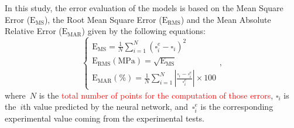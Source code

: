 \documentclass[algorithms,article,submit,pdftex,oneauthors]{Definitions/mdpi}
\DeclareRobustCommand{\MSE}{\text{E}_\text{MS}}
\DeclareRobustCommand{\RMSE}{\text{E}_\text{RMS}}
\DeclareRobustCommand{\MARE}{\text{E}_\text{MAR}}
\DeclareRobustCommand{\MPa}{\text{MPa}}
\begin{document}
In this study, the error evaluation of the models is based on the Mean Square Error ($\MSE$), the Root Mean Square Error ($\RMSE$) and the Mean Absolute Relative Error ($\MARE$) given by the following equations:
\begin{equation}
\begin{cases}
\MSE = \frac{1}{N} \sum_{i=1}^{N} \left(\square_i^e - \square_i\right)^2\\
\RMSE (\MPa) = \sqrt{\MSE}\\
\MARE(\%) = \frac{1}{N} \sum_{i=1}^{N}{\left|\frac{\square_i -\square_i^e}{\square_i^e}\right|} \times 100
\end{cases},
\label{eq:Errors}
\end{equation}
where~$N$ is the \textcolor{red}{total number of points for the computation of those errors}, $\square_i$ is the~$i$th value predicted by the neural network, and~$\square_i^e$ is the corresponding experimental value coming from the experimental tests.
\end{document}
